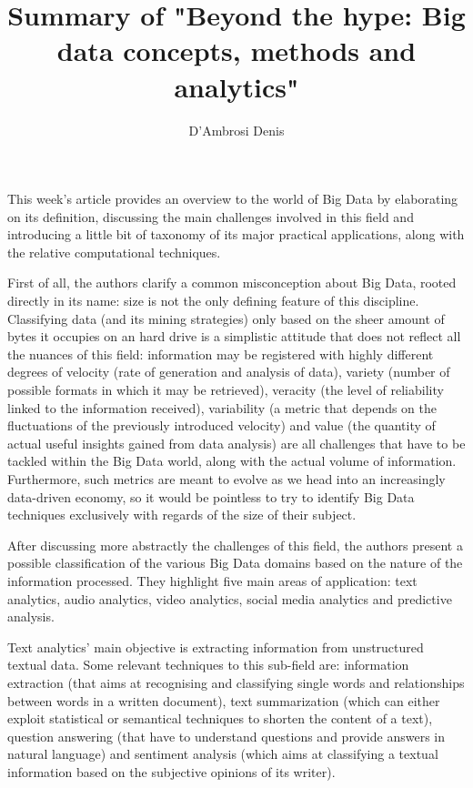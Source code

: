 \documentclass{article}
\title{Summary of "Beyond the hype: Big data concepts, methods and analytics"}
\author{D'Ambrosi Denis}
\begin{document}
\maketitle

This week's article provides an overview to the world of Big Data by elaborating on its definition, discussing the main challenges involved in this field and introducing a little bit of taxonomy of its major practical applications, along with the relative computational techniques.

First of all, the authors clarify a common misconception about Big Data, rooted directly in its name: size is not the only defining feature of this discipline. Classifying data (and its mining strategies) only based on the sheer amount of bytes it occupies on an hard drive is a simplistic attitude that does not reflect all the nuances of this field: information may be registered with highly different degrees of velocity (rate of generation and analysis of data), variety (number of possible formats in which it may be retrieved), veracity (the level of reliability linked to the information received), variability (a metric that depends on the fluctuations of the previously introduced velocity) and value (the quantity of actual useful insights gained from data analysis) are all challenges that have to be tackled within the Big Data world, along with the actual volume of information. Furthermore, such metrics are meant to evolve as we head into an increasingly data-driven economy, so it would be pointless to try to identify Big Data techniques exclusively with regards of the size of their subject.

After discussing more abstractly the challenges of this field, the authors present a possible classification of the various Big Data domains based on the nature of the information processed. They highlight five main areas of application: text analytics, audio analytics, video analytics, social media analytics and predictive analysis.

Text analytics' main objective is extracting information from unstructured textual data. Some relevant techniques to this sub-field are: information extraction (that aims at recognising and classifying single words and relationships between words in a written document), text summarization (which can either exploit statistical or semantical techniques to shorten the content of a text), question answering (that have to understand questions and provide answers in natural language) and sentiment analysis (which aims at classifying a textual information based on the subjective opinions of its writer).
\end{document}
